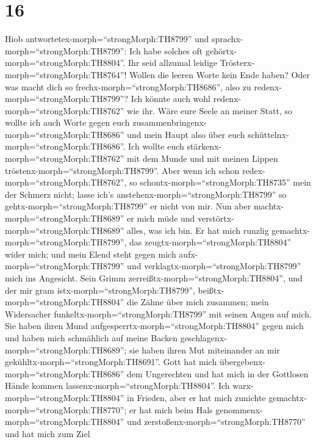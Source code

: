 \hypertarget{section-15}{%
\section{16}\label{section-15}}

 Hiob antwortetex-morph=``strongMorph:TH8799'' und
sprachx-morph=``strongMorph:TH8799'':  Ich habe solches oft
gehörtx-morph=``strongMorph:TH8804''. Ihr seid allzumal leidige
Trösterx-morph=``strongMorph:TH8764''!  Wollen die leeren
Worte kein Ende haben? Oder was macht dich so
frechx-morph=``strongMorph:TH8686'', also zu
redenx-morph=``strongMorph:TH8799''?  Ich könnte auch wohl
redenx-morph=``strongMorph:TH8762'' wie ihr. Wäre eure Seele an meiner
Statt, so wollte ich auch Worte gegen euch
zusammenbringenx-morph=``strongMorph:TH8686'' und mein Haupt also über
euch schüttelnx-morph=``strongMorph:TH8686''.  Ich wollte
euch stärkenx-morph=``strongMorph:TH8762'' mit dem Munde und mit meinen
Lippen tröstenx-morph=``strongMorph:TH8799''.  Aber wenn ich
schon redex-morph=``strongMorph:TH8762'', so
schontx-morph=``strongMorph:TH8735'' mein der Schmerz nicht; lasse ich's
anstehenx-morph=``strongMorph:TH8799'' so
gehtx-morph=``strongMorph:TH8799'' er nicht von mir.  Nun
aber machtx-morph=``strongMorph:TH8689'' er mich müde und
verstörtx-morph=``strongMorph:TH8689'' alles, was ich bin. 
Er hat mich runzlig gemachtx-morph=``strongMorph:TH8799'', das
zeugtx-morph=``strongMorph:TH8804'' wider mich; und mein Elend steht
gegen mich aufx-morph=``strongMorph:TH8799'' und
verklagtx-morph=``strongMorph:TH8799'' mich ins Angesicht. 
Sein Grimm zerreißtx-morph=``strongMorph:TH8804'', und der mir gram
istx-morph=``strongMorph:TH8799'', beißtx-morph=``strongMorph:TH8804''
die Zähne über mich zusammen; mein Widersacher
funkeltx-morph=``strongMorph:TH8799'' mit seinen Augen auf mich.
 Sie haben ihren Mund
aufgesperrtx-morph=``strongMorph:TH8804'' gegen mich und haben mich
schmählich auf meine Backen geschlagenx-morph=``strongMorph:TH8689'';
sie haben ihren Mut miteinander an mir
gekühltx-morph=``strongMorph:TH8691''.  Gott hat mich
übergebenx-morph=``strongMorph:TH8686'' dem Ungerechten und hat mich in
der Gottlosen Hände kommen lassenx-morph=``strongMorph:TH8804''.
 Ich warx-morph=``strongMorph:TH8804'' in Frieden, aber er
hat mich zunichte gemachtx-morph=``strongMorph:TH8770''; er hat mich
beim Hals genommenx-morph=``strongMorph:TH8804'' und
zerstoßenx-morph=``strongMorph:TH8770'' und hat mich zum Ziel
